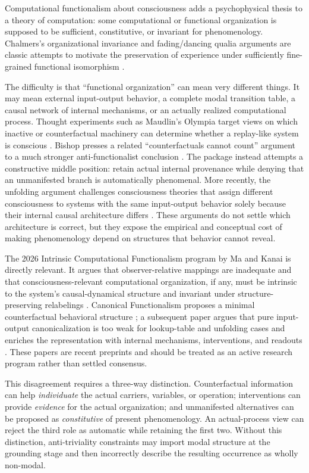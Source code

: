 \documentclass[11pt,a4paper]{article}
\begin{document}
Computational functionalism about consciousness adds a psychophysical thesis to a theory of computation: some computational or functional organization is supposed to be sufficient, constitutive, or invariant for phenomenology. Chalmers's organizational invariance and fading/dancing qualia arguments are classic attempts to motivate the preservation of experience under sufficiently fine-grained functional isomorphism \cite{Chalmers1996ConsciousMind,Chalmers1995AbsentQualia}.

The difficulty is that ``functional organization'' can mean very different things. It may mean external input-output behavior, a complete modal transition table, a causal network of internal mechanisms, or an actually realized computational process. Thought experiments such as Maudlin's Olympia target views on which inactive or counterfactual machinery can determine whether a replay-like system is conscious \cite{Maudlin1989}. Bishop presses a related ``counterfactuals cannot count'' argument to a much stronger anti-functionalist conclusion \cite{Bishop2002}. The package instead attempts a constructive middle position: retain actual internal provenance while denying that an unmanifested branch is automatically phenomenal. More recently, the unfolding argument challenges consciousness theories that assign different consciousness to systems with the same input-output behavior solely because their internal causal architecture differs \cite{Doerig2019}. These arguments do not settle which architecture is correct, but they expose the empirical and conceptual cost of making phenomenology depend on structures that behavior cannot reveal.

The 2026 Intrinsic Computational Functionalism program by Ma and Kanai is directly relevant. It argues that observer-relative mappings are inadequate and that consciousness-relevant computational organization, if any, must be intrinsic to the system's causal-dynamical structure and invariant under structure-preserving relabelings \cite{MaKanai2026}. Canonical Functionalism proposes a minimal counterfactual behavioral structure \cite{KanaiMaCanonical2026}; a subsequent paper argues that pure input-output canonicalization is too weak for lookup-table and unfolding cases and enriches the representation with internal mechanisms, interventions, and readouts \cite{KanaiMaICCR2026}. These papers are recent preprints and should be treated as an active research program rather than settled consensus.

This disagreement requires a three-way distinction. Counterfactual information can help \emph{individuate} the actual carriers, variables, or operation; interventions can provide \emph{evidence} for the actual organization; and unmanifested alternatives can be proposed as \emph{constitutive} of present phenomenology. An actual-process view can reject the third role as automatic while retaining the first two. Without this distinction, anti-triviality constraints may import modal structure at the grounding stage and then incorrectly describe the resulting occurrence as wholly non-modal.
\end{document}
